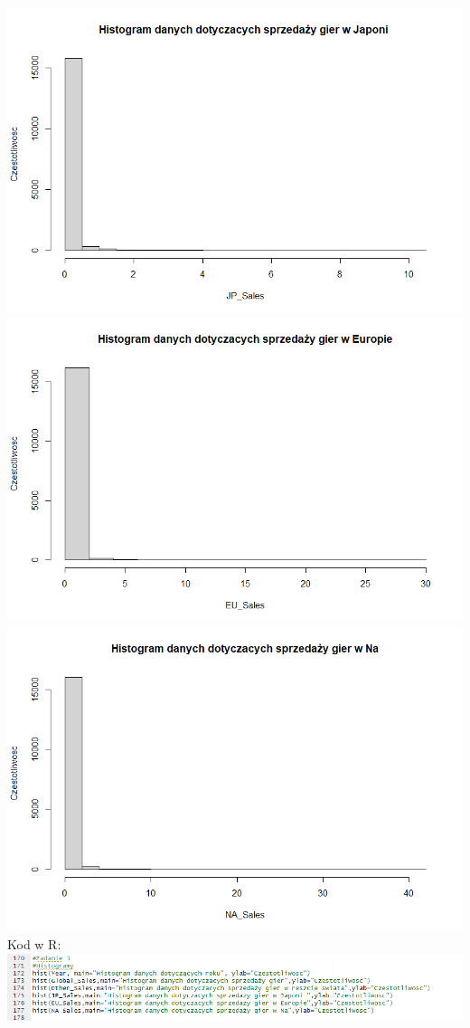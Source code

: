 \documentclass[12pt]{article}
\begin{document}
	\includegraphics[scale=0.6]{HistogramJP}\\
	\includegraphics[scale=0.6]{HistogramEU}\\
	\includegraphics[scale=0.6]{HistogramNA}\\
	Kod w R:\\
	\includegraphics[scale=0.5]{Zad3}
	\newpage
	
\end{document}
